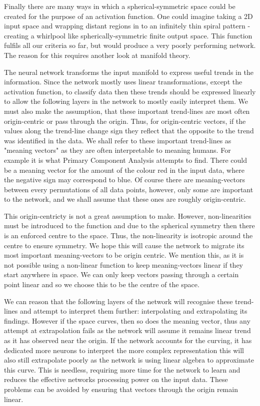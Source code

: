 \documentclass[onecolumn]{article}
\begin{document}
    Finally there are many ways in which a spherical-symmetric space could be created for the purpose of an activation function. One could imagine taking a 2D input space and wrapping distant regions in to an infinitely thin spiral pattern - creating a whirlpool like spherically-symmetric finite output space. This function fulfils all our criteria so far, but would produce a very poorly performing network. The reason for this requires another look at manifold theory.

    The neural network transforms the input manifold to express useful trends in the information. Since the network mostly uses linear transformations, except the activation function, to classify data then these trends should be expressed linearly to allow the following layers in the network to mostly easily interpret them. We must also make the assumption, that these important trend-lines are most often origin-centric or pass through the origin. Thus, for origin-centric vectors, if the values along the trend-line change sign they reflect that the opposite to the trend was identified in the data. We shall refer to these important trend-lines as "meaning vectors" as they are often interpretable to meaning humans. For example it is what Primary Component Analysis attempts to find. There could be a meaning vector for the amount of the colour red in the input data, where the negative sign may correspond to blue. Of course there are meaning-vectors between every permutations of all data points, however, only some are important to the network, and we shall assume that these ones are roughly origin-centric.

    This origin-centricty is not a great assumption to make. However, non-linearities must be introduced to the function and due to the spherical symmetry then there is an enforced centre to the space. Thus, the non-linearity is isotropic around the centre to ensure symmetry. We hope this will cause the network to migrate its most important meaning-vectors to be origin centric. We mention this, as it is not possible using a non-linear function to keep meaning-vectors linear if they start anywhere in space. We can only keep vectors passing through a certain point linear and so we choose this to be the centre of the space.

    We can reason that the following layers of the network will recognise these trend-lines and attempt to interpret them further: interpolating and extrapolating its findings. However if the space curves, then so does the meaning vector, thus any attempt at extrapolation fails as the network will assume it remains linear trend as it has observed near the origin. If the network accounts for the curving, it has dedicated more neurons to interpret the more complex representation this will also still extrapolate poorly as the network is using linear algebra to approximate this curve. This is needless, requiring more time for the network to learn and reduces the effective networks processing power on the input data. These problems can be avoided by ensuring that vectors through the origin remain linear. 
        
\end{document}
